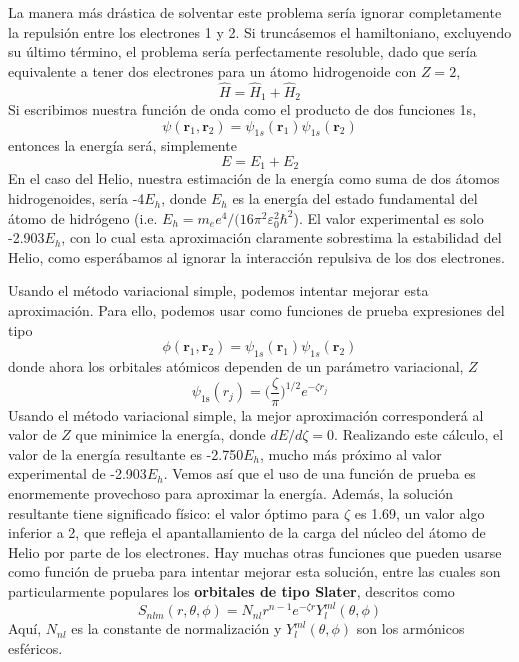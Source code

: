 La manera más drástica de solventar este problema 
sería ignorar completamente la repulsión entre los electrones
1 y 2. Si truncásemos el hamiltoniano, excluyendo su último
término, el problema sería perfectamente resoluble, dado
que sería equivalente a tener dos electrones para un átomo
hidrogenoide con $Z=2$,
\begin{equation}
\hat{H} = \hat{H}_1+ \hat{H}_2
\end{equation}
Si escribimos nuestra función de onda como
el producto de dos funciones 1s,
\begin{equation}
    \psi(\mathbf{r}_1, \mathbf{r}_2)=\psi_{1s}(\mathbf{r}_1)\psi_{1s}(\mathbf{r}_2)
\end{equation}
entonces la energía será, simplemente
\begin{equation}
    E = E_1 + E_2 
\end{equation}
En el caso del Helio, nuestra estimación de la energía
como suma de dos átomos hidrogenoides, sería -4$E_h$, 
donde $E_h$ es la energía del estado fundamental
del átomo de hidrógeno (i.e.
$E_h=m_ee^4/(16\pi^2\varepsilon_0^2\hbar^2$). El valor 
experimental es solo -2.903$E_h$, con lo cual esta aproximación
claramente sobrestima la estabilidad del Helio, como
esperábamos al ignorar la interacción repulsiva
de los dos electrones.

Usando el método variacional simple, podemos intentar mejorar 
esta aproximación. Para ello, podemos usar como funciones
de prueba expresiones del tipo
\begin{equation}
    \phi(\mathbf{r}_1, \mathbf{r}_2)=\psi_{1s}(\mathbf{r}_1)\psi_{1s}(\mathbf{r}_2)
\end{equation}
donde ahora los orbitales atómicos dependen de un 
parámetro variacional, $Z$
\begin{equation}
    \psi_\mathrm{1s}(r_j)=\bigg(\frac{\zeta}{\pi}\bigg)^{1/2}e^{-\zeta r_j}
\end{equation}
Usando el método variacional simple, la mejor aproximación
corresponderá al valor de $Z$ que minimice la energía, donde
$dE/d\zeta=0$. Realizando este cálculo, el valor de la energía
resultante es -2.750$E_h$, mucho más próximo al valor 
experimental de -2.903$E_h$. Vemos así que el uso de una
función de prueba es enormemente provechoso para aproximar
la energía. Además, la solución resultante tiene significado
físico: el valor óptimo para $\zeta$ es 1.69, un valor algo
inferior a 2, que refleja el apantallamiento de la carga del
núcleo del átomo de Helio por parte de los electrones. 
Hay muchas otras funciones que pueden usarse como función de
prueba para intentar mejorar esta solución, entre las cuales
son particularmente populares los \textbf{orbitales de tipo Slater},
descritos como
\begin{equation}
    S_{nlm}(r, \theta, \phi)=N_{nl}r^{n-1}e^{-\zeta r}Y_l^{ml}(\theta, \phi)
\end{equation}
Aquí, $N_{nl}$ es la constante de normalización y $Y_l^{ml}(\theta, \phi)$ son los armónicos esféricos.

